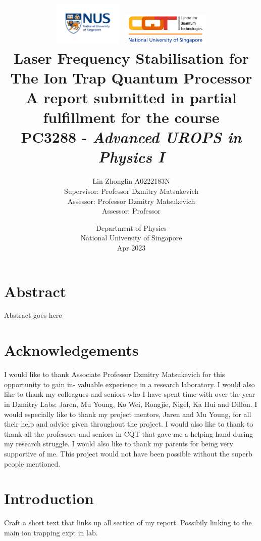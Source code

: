 \documentclass[12pt]{report}
\title{
\includegraphics[width=0.25\textwidth]{nus_logo.jpeg}
\includegraphics[width=0.32\textwidth]{cqt_logo.png}\\
{\LARGE \textbf{Laser Frequency Stabilisation for The Ion Trap Quantum Processor}}\\
\vspace{5mm}
{\normalsize A report submitted in partial fulfillment for the course}\\
{\normalsize PC3288 - \textit{Advanced UROPS in Physics I}}
}
\author{
{\normalsize Lin Zhonglin \hspace{10mm} A0222183N}\\
\vspace{1mm}
{\normalsize Supervisor: Professor Dzmitry Matsukevich}\\
{\normalsize Assessor: Professor Dzmitry Matsukevich}\\
{\normalsize Assessor: Professor }}\\
\date{{\normalsize Department of Physics}\\
{\normalsize National University of Singapore}\\
{\normalsize Apr 2023}}
\begin{document}
\maketitle

\chapter*{Abstract}
Abstract goes here


\chapter*{Acknowledgements}
I would like to thank Associate Professor Dzmitry Matsukevich for this opportunity to gain in- valuable experience in a research laboratory.
I would also like to thank my colleagues and seniors who I have spent time with over the year in Dzmitry Labs: Jaren, Mu Young, Ko Wei, Rongjie, Nigel, Ka Hui and Dillon. I would especially like to thank my project mentors, Jaren and Mu Young, for all their help and advice given throughout the project. I would also like to thank to thank all the professors and seniors in CQT that gave me a helping hand during my research struggle. 
I would also like to thank my parents for being very supportive of me.
This project would not have been possible without the superb people mentioned.

\tableofcontents

\chapter{Introduction}
Craft a short text that links up all section of my report. Possibily linking to the main ion trapping expt in lab. 
\end{document}
